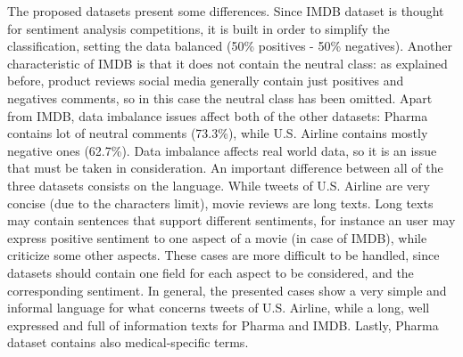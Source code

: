 The proposed datasets present some differences. 
Since IMDB dataset is thought for sentiment analysis competitions, it is built in order to simplify the classification, setting the data balanced (50\% positives - 50\% negatives). Another characteristic of IMDB is that it does not contain the neutral class: as explained before, product reviews social media generally contain just positives and negatives comments, so in this case the neutral class has been omitted. 
Apart from IMDB, data imbalance issues affect both of the other datasets: Pharma contains lot of neutral comments (73.3\%), while U.S. Airline contains  mostly negative ones (62.7\%). Data imbalance affects real world data, so it is an issue that must be taken in consideration.
An important difference between all of the three datasets consists on the language. While tweets of U.S. Airline are very concise (due to the characters limit), movie reviews are long texts. Long texts may contain sentences that support different sentiments, for instance an user may express positive sentiment to one aspect of a movie (in case of IMDB), while criticize some other aspects. These cases are more difficult to be handled, since datasets should contain one field for each aspect to be considered, and the corresponding sentiment. In general, the presented cases show a very simple and informal language for what concerns tweets of U.S. Airline, while a long, well expressed and full of information texts for Pharma and IMDB. Lastly, Pharma dataset contains also medical-specific terms.



